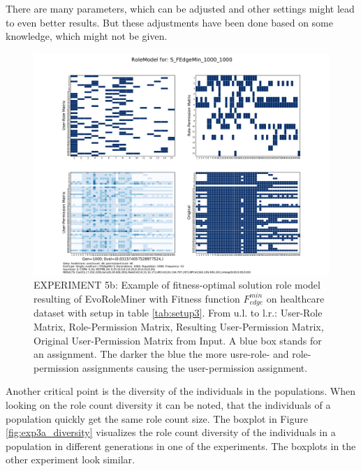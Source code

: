 There are many parameters, which can be adjusted and other settings might lead to even better results. But these adjustments have been done based on some knowledge, which might not be given.

\begin{figure}[H]
    \centering
    \includegraphics[scale=0.37, trim=4cm 2cm 4cm 2cm, clip=true]{./Figures/exp5edge_RM}
    \caption{EXPERIMENT 5b: Example of fitness-optimal solution role model resulting of EvoRoleMiner with Fitness function $F_{edge}^{min}$ on healthcare dataset with setup in table \ref{tab:setup3}. From u.l. to l.r.: User-Role Matrix, Role-Permission Matrix, Resulting User-Permission Matrix, Original User-Permission Matrix from Input. A blue box stands for an assignment. The darker the blue the more usre-role- and role-permission assignments causing the user-permission assignment.}
    \label{fig:exp5edge_RM}
\end{figure}

Another critical point is the diversity of the individuals in the populations. When looking on the role count diversity it can be noted, that the individuals of a population quickly get the same role count size. The boxplot in Figure \ref{fig:exp3a_diversity} visualizes the role count diversity of the individuals in a population in different generations in one of the experiments. The boxplots in the other experiment look similar.

